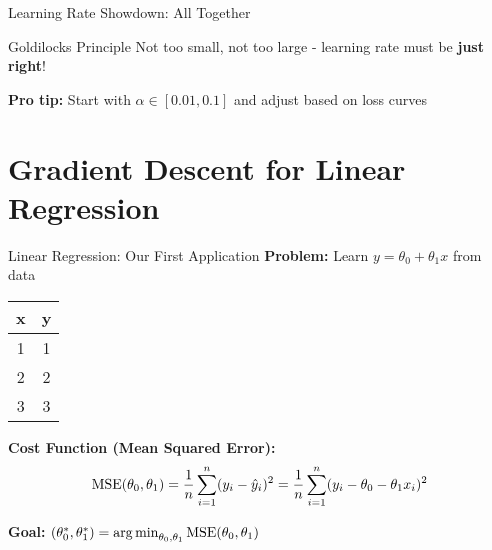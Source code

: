\documentclass[usenames,dvipsnames]{beamer}
\begin{document}
\begin{frame}{Learning Rate Showdown: All Together}
\begin{center}
    \end{center}
    
    \footnotesize
    \vspace{0.5cm}
    \begin{theorembox}{Goldilocks Principle}
    {\small Not too small, not too large - learning rate must be \textbf{just right}!}
    \end{theorembox}
    
    \begin{keypointsbox}{}
    {\small \textbf{Pro tip:} Start with $\alpha \in [0.01, 0.1]$ and adjust based on loss curves}
    \end{keypointsbox}
  \end{frame}

  \section{Gradient Descent for Linear Regression}

  \begin{frame}{Linear Regression: Our First Application}
    \textbf{Problem:} Learn $y = \theta_0 + \theta_1 x$ from data
    
    \begin{center}
    \begin{tabular}{|c|c|}
        \hline
        \textbf{x} & \textbf{y} \\
        \hline
        1 & 1 \\
        2 & 2 \\
        3 & 3 \\
        \hline
    \end{tabular}
    \end{center}
    
    \pause
    \textbf{Cost Function (Mean Squared Error):}
    $$\operatorname{MSE}(\theta_0, \theta_1) = \frac{1}{n}\sum_{i=1}^n (y_i - \hat{y}_i)^2 = \frac{1}{n}\sum_{i=1}^n (y_i - \theta_0 - \theta_1 x_i)^2$$
    
    \pause
    \textbf{Goal:} $(\theta_0^*, \theta_1^*) = \operatorname*{arg\,min}_{\theta_0, \theta_1} \operatorname{MSE}(\theta_0, \theta_1)$
  \end{frame}
\end{document}
